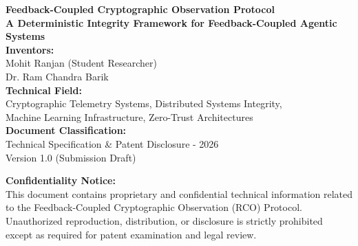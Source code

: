 \begin{titlepage}

\begin{center}


\vspace*{1cm}

{\Huge \textbf{Feedback-Coupled Cryptographic Observation Protocol}}\\[0.5cm]

{\large \textbf{A Deterministic Integrity Framework for Feedback-Coupled Agentic Systems}}\\[1cm]


\textbf{Inventors:}\\[0.5cm]

Mohit Ranjan (Student Researcher)\\
Dr. Ram Chandra Barik\\[1cm]


\textbf{Technical Field:}\\[0.3cm]

Cryptographic Telemetry Systems, Distributed Systems Integrity,\\
Machine Learning Infrastructure, Zero-Trust Architectures\\[1cm]


\textbf{Document Classification:}\\[0.3cm]

Technical Specification \& Patent Disclosure - 2026\\
Version 1.0 (Submission Draft)\\[1cm]


\begin{minipage}{0.85\textwidth}
\small
\textbf{Confidentiality Notice:} \\
This document contains proprietary and confidential technical information related to the Feedback-Coupled Cryptographic Observation (RCO) Protocol. Unauthorized reproduction, distribution, or disclosure is strictly prohibited except as required for patent examination and legal review.
\end{minipage}

\vfill

\end{center}

\end{titlepage}